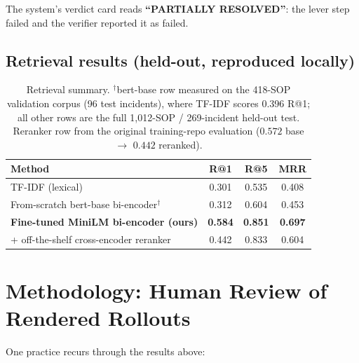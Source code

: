\documentclass[11pt]{article}
\begin{document}
The system's verdict card reads \textbf{``PARTIALLY RESOLVED''}: the lever step failed and the verifier reported it as failed.

\subsection{Retrieval results (held-out, reproduced locally)}

\begin{table}[ht]
\centering
\begin{tabular}{lccc}
\toprule
Method & R@1 & R@5 & MRR \\
\midrule
TF-IDF (lexical) & 0.301 & 0.535 & 0.408 \\
From-scratch bert-base bi-encoder$^{\dagger}$ & 0.312 & 0.604 & 0.453 \\
\textbf{Fine-tuned MiniLM bi-encoder (ours)} & \textbf{0.584} & \textbf{0.851} & \textbf{0.697} \\
+ off-the-shelf cross-encoder reranker & 0.442 & 0.833 & 0.604 \\
\bottomrule
\end{tabular}
\caption{Retrieval summary. $^{\dagger}$bert-base row measured on the 418-SOP validation corpus (96 test incidents), where TF-IDF scores 0.396 R@1; all other rows are the full 1{,}012-SOP / 269-incident held-out test. Reranker row from the original training-repo evaluation ($0.572$ base $\to$ $0.442$ reranked).}
\label{tab:retrieval-full}
\end{table}

\section{Methodology: Human Review of Rendered Rollouts}

One practice recurs through the results above:
\end{document}
